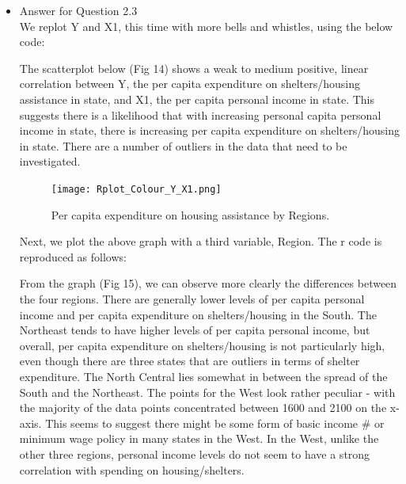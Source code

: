 \documentclass[12pt,letterpaper]{article}
\begin{document}
\begin{itemize}
\item
Answer for Question 2.3\\

\noindent We replot Y and X1, this time with more bells and whistles, using the below code:
\vspace{.5cm}
  
\vspace{.5cm}

\noindent The scatterplot below (Fig 14) shows a weak to medium positive, linear correlation between Y,  the per capita expenditure on shelters/housing assistance in state, and X1, the per capita personal income in state. This suggests there is a likelihood that with increasing personal capita personal income in state, there is increasing per capita expenditure on shelters/housing in state. There are a number of outliers in the data that need to be investigated.\\

\newpage
\begin{figure}[hbtp!]\centering
	\caption{\footnotesize Per capita expenditure on housing assistance by Regions.}
	\label{boxplot}
	\texttt{[image: Rplot\_Colour\_Y\_X1.png]}
\end{figure}

\newpage
\noindent Next, we plot the above graph with a third variable, Region. The r code is reproduced as follows:
\vspace{.5cm}
  
\vspace{.5cm}

\noindent From the graph (Fig 15), we can observe more clearly the differences between the four regions. There are generally lower levels of per capita personal income and per capita expenditure on shelters/housing in the South. The Northeast tends to have higher levels of per capita personal income, but overall, per capita expenditure on shelters/housing is not particularly high, even though there are three states that are outliers in terms of shelter expenditure. The North Central lies somewhat in between the spread of the South and the Northeast. The points for the West look rather peculiar - with the majority of the data points concentrated between 1600 and 2100 on the x-axis. This seems to suggest there might be some form of basic income
# or minimum wage policy in many states in the West. In the West, unlike the other three regions, personal income levels do not seem to have a strong correlation with spending on housing/shelters.\\


\end{itemize}
\end{document}
